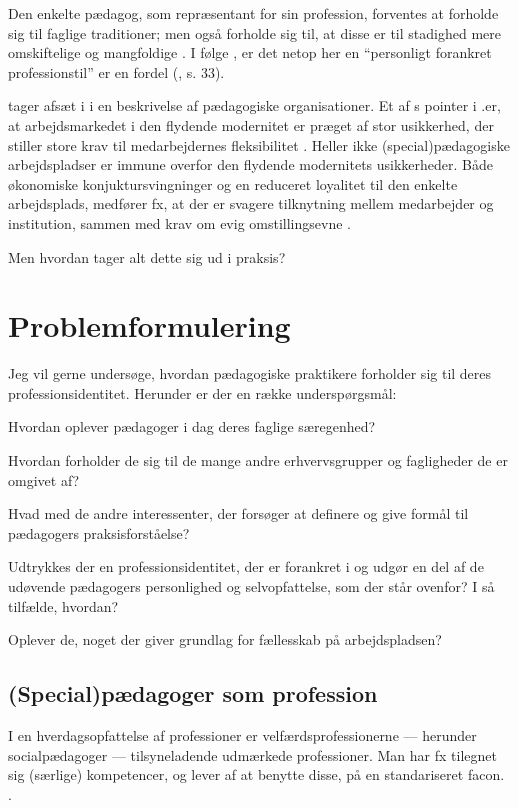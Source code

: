 Den enkelte pædagog, som repræsentant for sin profession, forventes at forholde sig til faglige traditioner; men også forholde sig til, at disse er til stadighed mere omskiftelige og mangfoldige \autocite[s.33]{hansbolKonstruktionAfProfessionel2008}. I følge \citeauthor{hansbolKonstruktionAfProfessionel2008}, er det netop her en “personligt forankret professionstil” er en fordel (\citeyear{hansbolKonstruktionAfProfessionel2008}, s. 33).

\citeauthor{kofodOrganisationOgLedelse2016} tager afsæt i \citeauthor{baumanLiquidModernity2000} i en beskrivelse af pædagogiske organisationer. 
Et af \citeauthor{baumanLiquidModernity2000}s pointer i .er, at arbejdsmarkedet i den flydende modernitet er præget af stor usikkerhed, der stiller store krav til medarbejdernes fleksibilitet \autocite[s. 147; 151]{baumanLiquidModernity2000}.
Heller ikke (special)pædagogiske arbejdspladser er immune overfor den flydende modernitets usikkerheder.
Både økonomiske konjuktursvingninger og en reduceret loyalitet til den enkelte arbejdsplads, medfører fx, at der er svagere tilknytning mellem medarbejder og institution, sammen med krav om evig omstillingsevne \autocite[s. 166f]{kofodOrganisationOgLedelse2016}.

Men hvordan tager alt dette sig ud i praksis?

\section{Problemformulering}
Jeg vil gerne undersøge, hvordan pædagogiske praktikere forholder sig til deres professionsidentitet.
Herunder er der en række underspørgsmål:

Hvordan oplever pædagoger i dag deres faglige særegenhed?

Hvordan forholder de sig til de mange andre erhvervsgrupper og fagligheder de er omgivet af?

Hvad med de andre interessenter, der forsøger at definere og give formål til pædagogers praksisforståelse?

Udtrykkes der en professionsidentitet, der er forankret i og udgør en del af de udøvende pædagogers personlighed og selvopfattelse, som der står ovenfor?
I så tilfælde, hvordan?

Oplever de, noget der giver grundlag for fællesskab på arbejdspladsen?

\subsection{(Special)pædagoger som profession}
I en hverdagsopfattelse af professioner er velfærdsprofessionerne — herunder socialpædagoger — tilsyneladende udmærkede professioner.
Man har fx tilegnet sig (særlige) kompetencer, og lever af at benytte disse, på en standariseret facon. \autocite[ss. 443-445]{frederiksenVelfaerdsprofessionerMellemOmsorg2017}.

